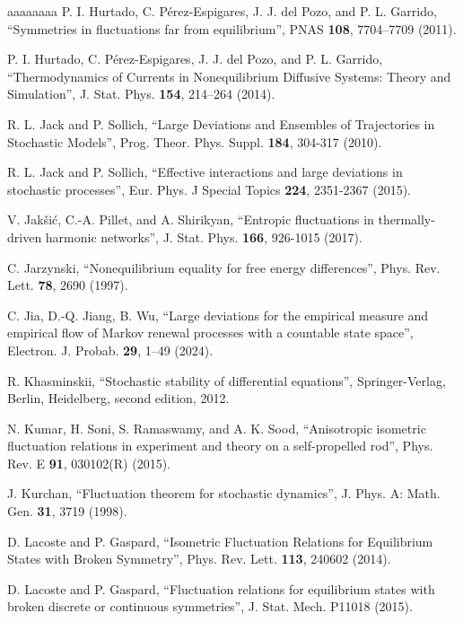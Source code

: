 \documentclass[a4paper,11pt]{article}
\numberwithin{equation}{section}
\begin{document}
\begin{thebibliography}{aaaaaaaa}
 P. I. Hurtado, C. P\'erez-Espigares, J. J. del Pozo, and P. L. Garrido, ``Symmetries in fluctuations far from equilibrium'', PNAS {\bf 108}, 7704–7709 (2011).

 P. I. Hurtado, C. P\'erez-Espigares, J. J. del Pozo, and P. L. Garrido, ``Thermodynamics of Currents in Nonequilibrium Diffusive Systems: Theory and Simulation'', J. Stat. Phys. {\bf 154}, 214–264 (2014).

 R. L. Jack and P. Sollich, ``Large Deviations and Ensembles of Trajectories in Stochastic Models'', Prog. Theor. Phys. Suppl. {\bf 184}, 304-317 (2010).

 R. L. Jack and P. Sollich, ``Effective interactions and large deviations in stochastic processes'', Eur. Phys. J Special Topics {\bf 224}, 2351-2367 (2015).

 V. Jak\v{s}i\'c, C.-A. Pillet, and A. Shirikyan, ``Entropic fluctuations in thermally-driven harmonic networks'', J. Stat. Phys. {\bf 166}, 926-1015 (2017).

 C. Jarzynski, ``Nonequilibrium equality for free energy differences'', Phys. Rev. Lett. {\bf 78}, 2690 (1997).

 C. Jia, D.-Q. Jiang, B. Wu, ``Large deviations for the empirical measure and empirical flow of Markov renewal processes with a
countable state space'', Electron. J. Probab. {\bf 29}, 1–49 (2024).

 R. Khasminskii, ``Stochastic stability of differential equations'', Springer-Verlag, Berlin, Heidelberg, second edition, 2012.

 N. Kumar, H. Soni, S. Ramaswamy, and A. K. Sood, ``Anisotropic isometric fluctuation relations in experiment and theory on a self-propelled rod'', Phys. Rev. E {\bf 91}, 030102(R) (2015).

 J. Kurchan, ``Fluctuation theorem for stochastic dynamics'', J. Phys. A: Math. Gen. {\bf 31}, 3719 (1998).

 D. Lacoste and P. Gaspard, ``Isometric Fluctuation Relations for Equilibrium States with Broken Symmetry'', Phys. Rev. Lett. {\bf 113}, 240602 (2014).

 D. Lacoste and P. Gaspard, ``Fluctuation relations for equilibrium states with broken discrete or continuous symmetries'', J. Stat. Mech. P11018 (2015).


\end{thebibliography}
\end{document}
